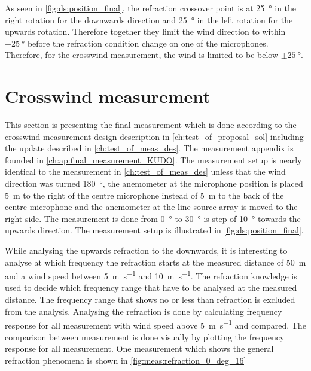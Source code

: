 As seen in \autoref{fig:ds:position_final}, the refraction crossover point is at \SI{25}{\degree} in the right rotation for the downwards direction and \SI{25}{\degree} in the left rotation for the upwards rotation. Therefore together they limit the wind direction to within $\pm\SI{25}{\degree}$ before the refraction condition change on one of the microphones. Therefore, for the crosswind measurement, the wind is limited to be below $\pm\SI{25}{\degree}$. 


\section{Crosswind measurement}\label{mes:kudo:cross_mes}
This section is presenting the final measurement which is done according to the crosswind measurement design description in \autoref{ch:test_of_proposal_sol} including the update described in \autoref{ch:test_of_meas_des}. The measurement appendix is founded in \autoref{ch:ap:final_measurement_KUDO}. The measurement setup is nearly identical to the measurement in \autoref{ch:test_of_meas_des} unless that the wind direction was turned \SI{180}{\degree}, the anemometer at the microphone position is placed \SI{5}{\meter} to the right of the centre microphone instead of \SI{5}{\meter} to the back of the centre microphone and the anemometer at the line source array is moved to the right side. The measurement is done from  \SI{0}{\degree} to  \SI{30}{\degree} is step of  \SI{10}{\degree} towards the upwards direction. The measurement setup is illustrated in \autoref{fig:ds:position_final}.





While analysing the upwards refraction to the downwards, it is interesting to analyse at which frequency the refraction starts at the measured distance of \SI{50}{\meter} and a wind speed between \SI{5}{\meter\per\second} and \SI{10}{\meter\per\second}. The refraction knowledge is used to decide which frequency range that have to be analysed at the measured distance. The frequency range that shows no or less than  refraction is excluded from the analysis. Analysing the refraction is done by calculating frequency response for all measurement with wind speed above \SI{5}{\meter\per\second} and compared. The comparison between measurement is done visually by plotting the frequency response for all measurement. One measurement which shows the general refraction phenomena is shown in \autoref{fig:meas:refraction_0_deg_16}



